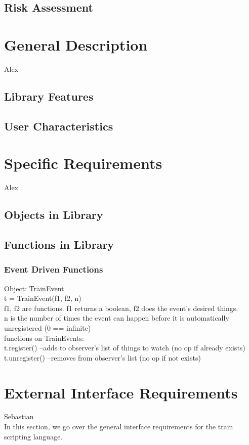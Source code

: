 \documentclass[a4paper,11pt,notitlepage]{article}
\begin{document}
\subsection{Risk Assessment}

\section{General Description}
Alex
\subsection{Library Features}
\subsection{User Characteristics}

\section{Specific Requirements}
Alex
\subsection{Objects in Library}
\subsection{Functions in Library}
\subsubsection{Event Driven Functions}
Object: TrainEvent
\\t = TrainEvent(f1, f2, n)
\\f1, f2 are functions. f1 returns a boolean, f2 does the event's desired things.
\\n is the number of times the event can happen before it is automatically unregistered (0 == infinite)
\\functions on TrainEvents:
\\t.register()	--adds to observer's list of things to watch (no op if already exists)
\\t.unregister()	--removes from observer's list (no op if not exists)

\section{External Interface Requirements}
Sebastian\\
    In this section, we go over the general interface requirements for the train scripting language.
\end{document}
